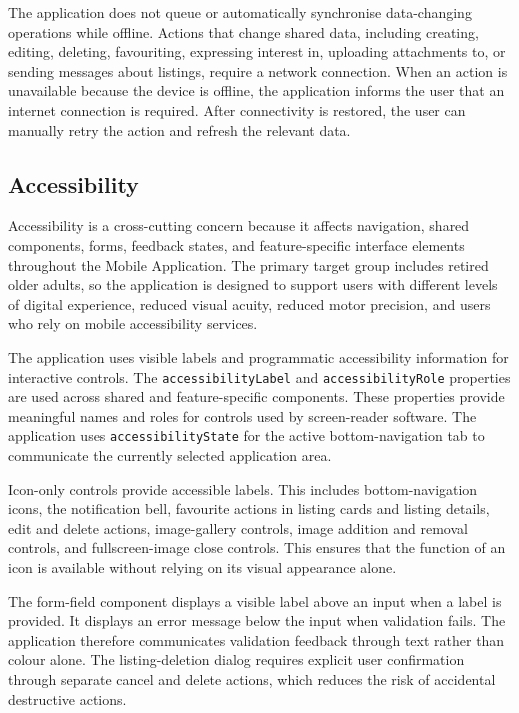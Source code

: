 The application does not queue or automatically synchronise data-changing operations while offline.
Actions that change shared data, including creating, editing, deleting, favouriting, expressing interest in, uploading attachments to, or sending messages about listings, require a network connection.
When an action is unavailable because the device is offline, the application informs the user that an internet connection is required.
After connectivity is restored, the user can manually retry the action and refresh the relevant data.

\subsection{Accessibility}
\label{sec:accessibility}

Accessibility is a cross-cutting concern because it affects navigation, shared components, forms, feedback states, and feature-specific interface elements throughout the \tradesq{} Mobile Application.
The primary target group includes retired older adults, so the application is designed to support users with different levels of digital experience, reduced visual acuity, reduced motor precision, and users who rely on mobile accessibility services.

The application uses visible labels and programmatic accessibility information for interactive controls.
The \texttt{accessibilityLabel} and \texttt{accessibilityRole} properties are used across shared and feature-specific components.
These properties provide meaningful names and roles for controls used by screen-reader software.
The application uses \texttt{accessibilityState} for the active bottom-navigation tab to communicate the currently selected application area.

Icon-only controls provide accessible labels.
This includes bottom-navigation icons, the notification bell, favourite actions in listing cards and listing details, edit and delete actions, image-gallery controls, image addition and removal controls, and fullscreen-image close controls.
This ensures that the function of an icon is available without relying on its visual appearance alone.

The form-field component displays a visible label above an input when a label is provided.
It displays an error message below the input when validation fails.
The application therefore communicates validation feedback through text rather than colour alone.
The listing-deletion dialog requires explicit user confirmation through separate cancel and delete actions, which reduces the risk of accidental destructive actions.

